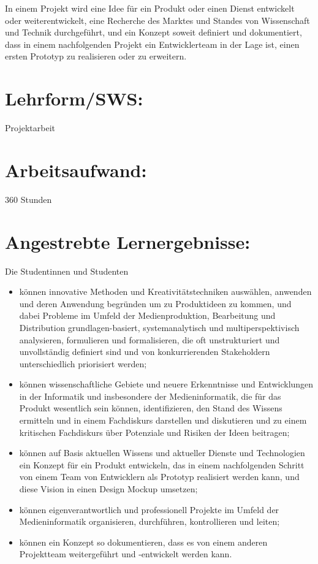 In einem Projekt wird eine Idee für ein Produkt oder einen Dienst
entwickelt oder weiterentwickelt, eine Recherche des Marktes und Standes
von Wissenschaft und Technik durchgeführt, und ein Konzept soweit
definiert und dokumentiert, dass in einem nachfolgenden Projekt ein
Entwicklerteam in der Lage ist, einen ersten Prototyp zu realisieren
oder zu erweitern.

\section*{Lehrform/SWS:}\label{lehrformsws-10}

Projektarbeit

\section*{Arbeitsaufwand:}\label{arbeitsaufwand-11}

360 Stunden

\section*{Angestrebte
Lernergebnisse:}\label{angestrebte-lernergebnisse-10}

Die Studentinnen und Studenten

\begin{itemize}
\tightlist
\item
  können innovative Methoden und Kreativitätstechniken auswählen,
  anwenden und deren Anwendung begründen um zu Produktideen zu kommen,
  und dabei Probleme im Umfeld der Medienproduktion, Bearbeitung und
  Distribution grundlagen-basiert, systemanalytisch und
  multiperspektivisch analysieren, formulieren und formalisieren, die
  oft unstrukturiert und unvollständig definiert sind und von
  konkurrierenden Stakeholdern unterschiedlich priorisiert werden;
\item
  können wissenschaftliche Gebiete und neuere Erkenntnisse und
  Entwicklungen in der Informatik und insbesondere der Medieninformatik,
  die für das Produkt wesentlich sein können, identifizieren, den Stand
  des Wissens ermitteln und in einem Fachdiskurs darstellen und
  diskutieren und zu einem kritischen Fachdiskurs über Potenziale und
  Risiken der Ideen beitragen;
\item
  können auf Basis aktuellen Wissens und aktueller Dienste und
  Technologien ein Konzept für ein Produkt entwickeln, das in einem
  nachfolgenden Schritt von einem Team von Entwicklern als Prototyp
  realisiert werden kann, und diese Vision in einen Design Mockup
  umsetzen;
\item
  können eigenverantwortlich und professionell Projekte im Umfeld der
  Medieninformatik organisieren, durchführen, kontrollieren und leiten;
\item
  können ein Konzept so dokumentieren, dass es von einem anderen
  Projektteam weitergeführt und -entwickelt werden kann.
\end{itemize}

